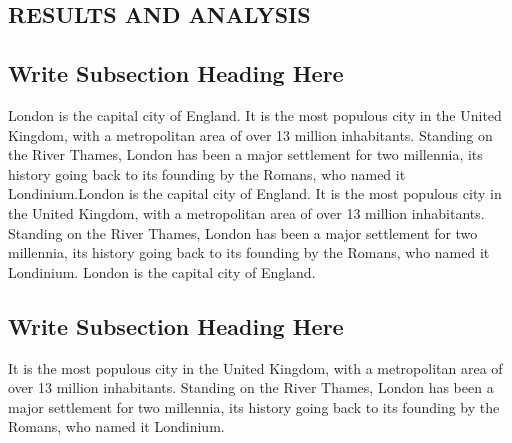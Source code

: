 \begin{center}
	\justifying
	\chapter{RESULTS AND ANALYSIS}
	
	\section{Write Subsection Heading Here} 
	London is the capital city of England. It is the most populous city in the United Kingdom, with a metropolitan area of over 13 million inhabitants. Standing on the River Thames, London has been a major settlement for two millennia, its history going back to its founding by the Romans, who named it Londinium.London is the capital city of England. It is the most populous city in the United Kingdom, with a metropolitan area of over 13 million inhabitants. Standing on the River Thames, London has been a major settlement for two millennia, its history going back to its founding by the Romans, who named it Londinium. London is the capital city of England.\\
	
	\section{Write Subsection Heading Here} 
	It is the most populous city in the United Kingdom, with a metropolitan area of over 13 million inhabitants. Standing on the River Thames, London has been a major settlement for two millennia, its history going back to its founding by the Romans, who named it Londinium.
\end{center}